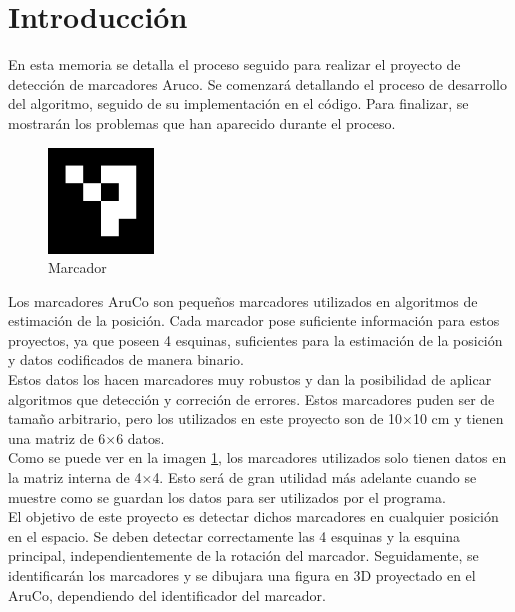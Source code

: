 \documentclass{article}
\begin{document}
\tableofcontents
\newpage

\section{Introducción}
\label{introduction}

En esta memoria se detalla el proceso seguido para realizar el proyecto de detección de marcadores Aruco. Se comenzará detallando el proceso de desarrollo del algoritmo, seguido de su implementación en el código. Para finalizar, se mostrarán los problemas que han aparecido durante el proceso.\\

\begin{figure}
  \vspace*{-1em}
  \begin{center}
    \includegraphics[width=0.25\textwidth]{../util/aruco_images/4x4_1000-0.png}
  \end{center}
  \vspace*{-1em}  
  \caption{Marcador}
  \label{fig:marker}
\end{figure}

Los marcadores AruCo son pequeños marcadores utilizados en algoritmos de estimación de la posición. Cada marcador pose suficiente información para estos proyectos, ya que poseen 4 esquinas, suficientes para la estimación de la posición y datos codificados de manera binario.\\
Estos datos los hacen marcadores muy robustos y dan la posibilidad de aplicar algoritmos que detección y correción de errores. Estos marcadores puden ser de tamaño arbitrario, pero los utilizados en este proyecto son de 10$\times$10 cm y tienen una matriz de 6$\times$6 datos.\\
Como se puede ver en la imagen \ref{fig:marker}, los marcadores utilizados solo tienen datos en la matriz interna de 4$\times$4. Esto será de gran utilidad más adelante cuando se muestre como se guardan los datos para ser utilizados por el programa.\\

El objetivo de este proyecto es detectar dichos marcadores en cualquier posición en el espacio. Se deben detectar correctamente las 4 esquinas y la esquina principal, independientemente de la rotación del marcador. Seguidamente, se identificarán los marcadores y se dibujara una figura en 3D proyectado en el AruCo, dependiendo del identificador del marcador.
\end{document}
